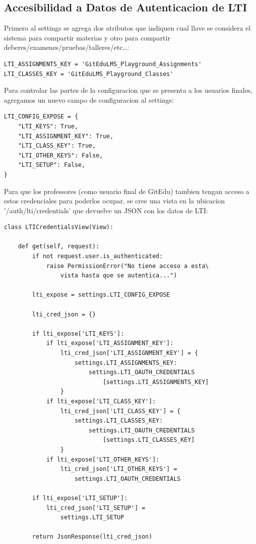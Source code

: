 \subsection{Accesibilidad a Datos de Autenticacion de LTI}
Primero al settings se agrega dos atributos que indiquen cual llave se considera el sistema para compartir materias y otro para compartir deberes/examenes/pruebas/talleres/etc\ldots{}:
\lstset{language=Python}
\begin{lstlisting}
LTI_ASSIGNMENTS_KEY = 'GitEduLMS_Playground_Assignments'
LTI_CLASSES_KEY = 'GitEduLMS_Playground_Classes'
\end{lstlisting}
\lstset{language=Bash}

Para controlar las partes de la configuracion que se presenta a los usuarios finales, agregamos un nuevo campo de configuracion al settings:
\lstset{language=Python}
\begin{lstlisting}
LTI_CONFIG_EXPOSE = {
    "LTI_KEYS": True,
    "LTI_ASSIGNMENT_KEY": True,
    "LTI_CLASS_KEY": True,
    "LTI_OTHER_KEYS": False,
    "LTI_SETUP": False,
}
\end{lstlisting}
\lstset{language=Bash}

Para que los professores (como usuario final de GitEdu) tambien tengan acceso a estos credenciales para poderlos ocupar, se cree una vista en la ubicacion '/auth/lti/credentials' que devuelve un JSON con los datos de LTI:
\lstset{language=Python}
\begin{lstlisting}
class LTICredentialsView(View):

    def get(self, request):
        if not request.user.is_authenticated:
            raise PermissionError("No tiene acceso a esta\
                vista hasta que se autentica...")

        lti_expose = settings.LTI_CONFIG_EXPOSE

        lti_cred_json = {}

        if lti_expose['LTI_KEYS']:
            if lti_expose['LTI_ASSIGNMENT_KEY']:
                lti_cred_json['LTI_ASSIGNMENT_KEY'] = {
                    settings.LTI_ASSIGNMENTS_KEY: 
                        settings.LTI_OAUTH_CREDENTIALS
                            [settings.LTI_ASSIGNMENTS_KEY]
                }
            if lti_expose['LTI_CLASS_KEY']:
                lti_cred_json['LTI_CLASS_KEY'] = {
                    settings.LTI_CLASSES_KEY:
                        settings.LTI_OAUTH_CREDENTIALS
                            [settings.LTI_CLASSES_KEY]
                }
            if lti_expose['LTI_OTHER_KEYS']:
                lti_cred_json['LTI_OTHER_KEYS'] =
                    settings.LTI_OAUTH_CREDENTIALS

        if lti_expose['LTI_SETUP']:
            lti_cred_json['LTI_SETUP'] =
                settings.LTI_SETUP

        return JsonResponse(lti_cred_json)
\end{lstlisting}
\lstset{language=Bash}

